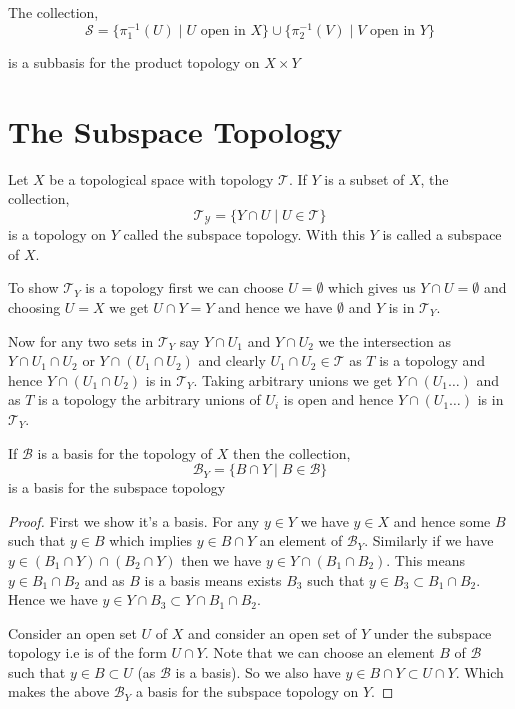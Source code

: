 \begin{theorem}
    The collection, 
    \[
        \mathcal{S} = \{\pi_{1}^{-1}(U) \mid U \text{ open in }X\} \cup \{\pi_{2}^{-1}(V) \mid V \text{ open in }Y\}
    \]

    is a subbasis for the product topology on $X \times Y$
\end{theorem}
\section{The Subspace Topology}
\begin{definition}
    Let $X$ be a topological space with topology $\mathcal{T}$. If $Y$ is a subset of $X$, the collection, 
    \[
        \mathcal{T_Y} = \{Y \cap U \mid U \in \mathcal{T}\}
    \]
    is a topology on $Y$ called the subspace topology. With this $Y$ is called a subspace of $X$.
\end{definition}

\vspace{1em}

To show $\mathcal{T}_Y$ is a topology first we can choose $U = \emptyset$ which gives us $Y \cap U = \emptyset$ and choosing $U = X$ we get $U \cap Y = Y$ and hence we have $\emptyset$ and $Y$ is in $\mathcal{T}_Y$.

\vspace{1em}

Now for any two sets in $\mathcal{T}_Y$ say $Y \cap U_{1}$ and $Y \cap U_{2}$ we the intersection as $Y \cap U_{1} \cap U_{2}$ or $Y \cap (U_{1} \cap U_{2})$ and clearly $U_{1} \cap U_{2} \in \mathcal{T}$ as $T$ is a topology and hence $Y \cap (U_{1} \cap U_{2})$ is in $\mathcal{T}_Y$. Taking arbitrary unions we get $Y \cap (U_{1} \dots)$ and as $T$ is a topology the arbitrary unions of $U_i$ is open and hence $Y \cap (U_{1} \dots )$ is in $\mathcal{T}_Y$.


\begin{lemma}
   If $\mathcal{B}$ is a basis for the topology of $X$ then the collection, 
   \[
    \mathcal{B}_Y = \{B \cap Y \mid B \in \mathcal{B}\}
   \] 
   is a basis for the subspace topology
\end{lemma}
\begin{proof}
   First we show it's a basis. For any $y \in Y$  we have $y \in X$ and hence some $B$ such that $y \in B$ which implies $y \in B \cap Y$ an element of $\mathcal{B}_Y$. Similarly if we have $y \in (B_{1} \cap Y) \cap (B_{2} \cap Y) $ then we have $y \in Y \cap (B_{1} \cap B_{2})$. This means $y \in B_{1} \cap B_{2}$ and as $B$ is a basis means exists $B_{3}$ such that $y \in B_{3} \subset B_{1} \cap B_{2}$. Hence we have $y \in Y \cap B_{3} \subset Y \cap B_{1} \cap B_{2}$.

   \vspace{1em}
   
    Consider an open set $U$ of $X$ and consider an open set of $Y$ under the subspace topology i.e is of the form $U \cap Y$. Note that we can choose an element $B$ of $\mathcal{B}$ such that $y \in B \subset U$ (as $\mathcal{B}$ is a basis). So we also have $ y\in B \cap Y \subset U \cap Y$. Which makes the above $\mathcal{B}_Y$ a basis for the subspace topology on $Y$.
\end{proof}

